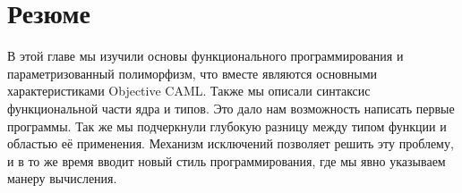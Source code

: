 \section{Резюме}
\label{sec:summary_2}

В этой главе мы изучили основы функционального программирования и
параметризованный полиморфизм, что вместе являются основными характеристиками
Objective CAML. Также мы описали синтаксис функциональной части ядра и типов.
Это дало нам возможность написать первые программы. Так же мы подчеркнули
глубокую разницу между типом функции и областью её применения. Механизм
исключений позволяет решить эту проблему, и в то же время вводит новый стиль
программирования, где мы явно указываем манеру вычисления.
